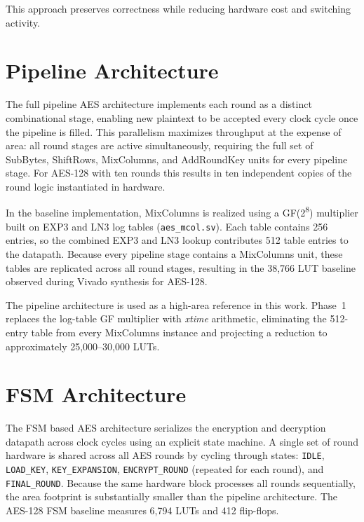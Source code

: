 This approach preserves correctness while reducing hardware cost and switching activity.

\section{Pipeline Architecture}

The full pipeline AES architecture implements each round as a distinct combinational stage,
enabling new plaintext to be accepted every clock cycle once the pipeline is filled.
This parallelism maximizes throughput at the expense of area: all round stages are active
simultaneously, requiring the full set of SubBytes, ShiftRows, MixColumns, and AddRoundKey
units for every pipeline stage. For AES-128 with ten rounds this results in ten independent
copies of the round logic instantiated in hardware.

In the baseline implementation, MixColumns is realized using a GF(2\textsuperscript{8})
multiplier built on EXP3 and LN3 log tables (\texttt{aes\_mcol.sv}). Each table contains
256 entries, so the combined EXP3 and LN3 lookup contributes 512 table entries to the
datapath. Because every pipeline stage contains a MixColumns unit, these tables are
replicated across all round stages, resulting in the 38,766 LUT baseline observed during
Vivado synthesis for AES-128.

The pipeline architecture is used as a high-area reference in this work. Phase~1 replaces
the log-table GF multiplier with \textit{xtime} arithmetic, eliminating the 512-entry table
from every MixColumns instance and projecting a reduction to approximately 25,000--30,000
LUTs.

\section{FSM Architecture}

The FSM based AES architecture serializes the encryption and decryption datapath across
clock cycles using an explicit state machine. A single set of round hardware is shared across
all AES rounds by cycling through states: \texttt{IDLE}, \texttt{LOAD\_KEY},
\texttt{KEY\_EXPANSION}, \texttt{ENCRYPT\_ROUND} (repeated for each round), and
\texttt{FINAL\_ROUND}. Because the same hardware block processes all rounds sequentially,
the area footprint is substantially smaller than the pipeline architecture. The AES-128
FSM baseline measures 6,794 LUTs and 412 flip-flops.

